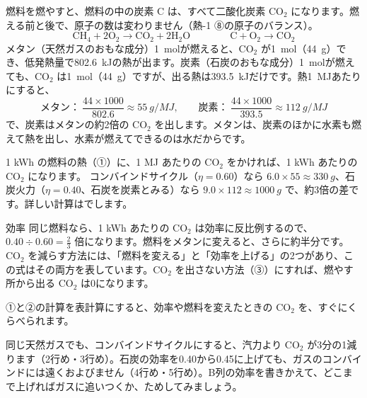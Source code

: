 \leavevmode\label{ph:熱-16:sec2}燃料を燃やすと、燃料の中の炭素 C は、すべて二酸化炭素 CO$_2$ になります。燃える前と後で、原子の数は変わりません（熱-1 ⑧の原子のバランス）。
\[\mathrm{CH_4}+2\mathrm{O_2}\to\mathrm{CO_2}+2\mathrm{H_2O}\qquad\qquad \mathrm{C}+\mathrm{O_2}\to\mathrm{CO_2}\]
メタン（天然ガスのおもな成分）\qty{1}{mol}が燃えると、CO$_2$ が\qty{1}{mol}（\qty{44}{g}）でき、低発熱量で\qty{802.6}{kJ}の熱が出ます。炭素（石炭のおもな成分）\qty{1}{mol}が燃えても、CO$_2$ は\qty{1}{mol}（\qty{44}{g}）ですが、出る熱は\qty{393.5}{kJ}だけです。熱\qty{1}{MJ}あたりにすると、
\[\text{メタン}：\ \frac{44\times1000}{802.6}\approx\qty{55}{g/MJ},\qquad \text{炭素}：\ \frac{44\times1000}{393.5}\approx\qty{112}{g/MJ}\]
で、炭素はメタンの約2倍の CO$_2$ を出します。メタンは、炭素のほかに水素も燃えて熱を出し、水素が燃えてできるのは水だからです。

1 kWh の燃料の熱（①）に、1 MJ あたりの CO$_2$ をかければ、1 kWh あたりの CO$_2$ になります。
\label{ph:熱-16:co2}コンバインドサイクル（$\eta=0.60$）なら $6.0\times55\approx\qty{330}{g}$、石炭火力（$\eta=0.40$、石炭を炭素とみる）なら $9.0\times112\approx\qty{1000}{g}$ で、約3倍の差です。詳しい計算はでします。
\begin{phbaisuru}[0.40から0.60に]{効率}
同じ燃料なら、1 kWh あたりの CO$_2$ は効率に反比例するので、$0.40\div0.60=\tfrac23$ 倍になります。燃料をメタンに変えると、さらに約半分です。CO$_2$ を減らす方法には、「燃料を変える」と「効率を上げる」の2つがあり、この式はその両方を表しています。CO$_2$ を出さない方法（③）にすれば、燃やす所から出る CO$_2$ は0になります。
\end{phbaisuru}

①と②の計算を表計算にすると、効率や燃料を変えたときの CO$_2$ を、すぐにくらべられます。
\begin{bkcenter}
\label{ph:熱-16:tab-sheet}
\end{bkcenter}
\noindent 同じ天然ガスでも、コンバインドサイクルにすると、汽力より CO$_2$ が3分の1減ります（2行め・3行め）。石炭の効率を0.40から0.45に上げても、ガスのコンバインドには遠くおよびません（4行め・5行め）。B列の効率を書きかえて、どこまで上げればガスに追いつくか、ためしてみましょう。

